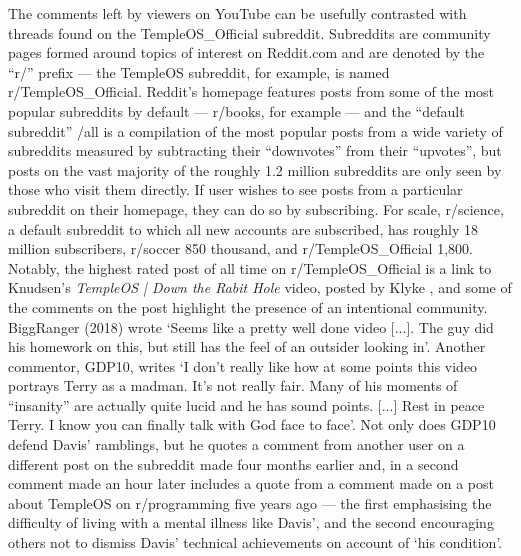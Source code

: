 \documentclass[Draft.tex]{subfiles}
\begin{document}
The comments left by viewers on YouTube can be usefully contrasted
with threads found on the TempleOS\_Official subreddit.
Subreddits are community pages formed around topics of interest on
Reddit.com and are denoted by the ``r/'' prefix --- the
TempleOS subreddit, for example, is named r/TempleOS\_Official.
Reddit's homepage features posts from some of the most popular
subreddits by default --- r/books, for example ---
and the ``default subreddit'' /all is a compilation of the most popular
posts from a wide variety of subreddits measured by subtracting their
``downvotes'' from their ``upvotes'',
but posts on the vast majority of the roughly 1.2 million subreddits
are only seen by those who visit them directly.
If user wishes to see posts from a particular subreddit on their
homepage, they can do so by subscribing.
For scale, r/science, a default subreddit to which all new accounts
are subscribed, has roughly 18 million subscribers,
r/soccer 850 thousand, and r/TempleOS\_Official 1,800.
Notably, the highest rated post of all time on r/TempleOS\_Official
is a link to Knudsen's \textit{TempleOS | Down the Rabit Hole} video,
posted by Klyke \parencite*{Klyke18},
and some of the comments on the post highlight the presence of
an intentional community.
BiggRanger (2018) wrote `Seems like a pretty well done video [...].
The guy did his homework on this,
but still has the feel of an outsider looking in'.
Another commentor, GDP10, writes
`I don't really like how at some points this video portrays Terry as a madman.
It's not really fair.  Many of his moments of ``insanity''
are actually quite lucid and he has sound points. [...]
Rest in peace Terry.  I know you can finally talk with God face to face'.
Not only does GDP10 defend Davis' ramblings, but he quotes a comment from
another user on a different post on the subreddit made four months earlier and,
in a second comment made an hour later includes a quote from a comment made
on a post about TempleOS on r/programming five years ago ---
the first emphasising the difficulty of living with a mental illness like
Davis', and the second encouraging others not to dismiss Davis'
technical achievements on account of `his condition'.
\end{document}
